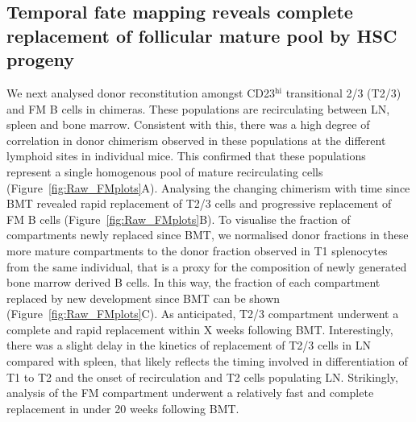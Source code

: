 \documentclass[11pt,onecolumn]{article}
\newcommand{\superscript}[1]{\ensuremath{^{\textrm{#1}}}} %
\begin{document}
\subsection*{Temporal fate mapping reveals complete replacement of follicular mature pool by HSC progeny}
We next analysed donor reconstitution amongst CD23\superscript{hi} transitional 2/3 (T2/3) and FM B cells in chimeras. These populations are recirculating between LN, spleen and bone marrow. Consistent with this, there was a high degree of correlation in donor chimerism observed in these populations at the different lymphoid sites in individual mice. This confirmed that these populations represent a single homogenous pool of mature recirculating cells (Figure~\ref{fig:Raw_FMplots}A). Analysing the changing chimerism with time since BMT revealed rapid replacement of T2/3 cells and progressive replacement of FM B cells (Figure~\ref{fig:Raw_FMplots}B). To visualise the fraction of compartments newly replaced since BMT, we normalised donor fractions in these more mature compartments to the donor fraction observed in T1 splenocytes from the same individual, that is a proxy for the composition of newly generated bone marrow derived B cells. In this way, the fraction of each compartment replaced by new development since BMT can be shown (Figure~\ref{fig:Raw_FMplots}C). As anticipated, T2/3 compartment underwent a complete and rapid replacement within X weeks following BMT. Interestingly, there was a slight delay in the kinetics of replacement of T2/3 cells in LN compared with spleen, that likely reflects the timing involved in differentiation of T1 to T2 and the onset of recirculation and T2 cells populating LN. Strikingly, analysis of the FM compartment underwent a relatively fast and complete replacement in under 20 weeks following BMT.
\end{document}
